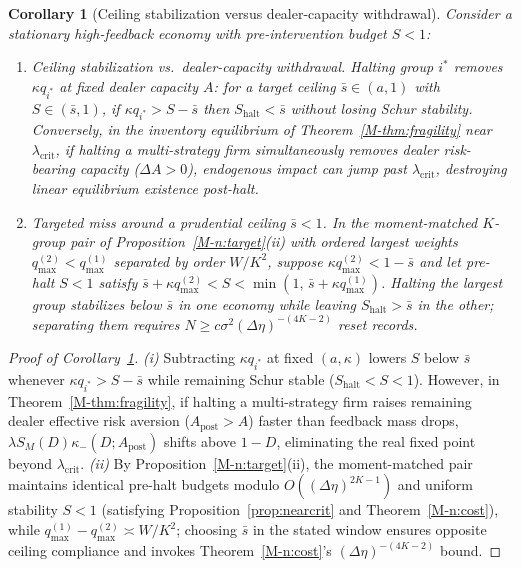 \documentclass[12pt]{article}
\newtheorem{corollary}[theorem]{Corollary}
\theoremstyle{definition}
\theoremstyle{remark}
\begin{document}
\begin{corollary}[Ceiling stabilization versus dealer-capacity withdrawal]\label{cor:posthaltflip}
Consider a stationary high-feedback economy with pre-intervention budget $S < 1$:
\begin{enumerate}
  \item[(i)] \emph{Ceiling stabilization vs.\ dealer-capacity withdrawal.} Halting group $i^*$ removes $\kappa q_{i^*}$ at fixed dealer capacity $A$: for a target ceiling $\bar{s} \in (a, 1)$ with $S \in (\bar{s}, 1)$, if $\kappa q_{i^*} > S - \bar{s}$ then $S_{\mathrm{halt}} < \bar{s}$ without losing Schur stability. Conversely, in the inventory equilibrium of Theorem~\ref{M-thm:fragility} near $\lambda_{\mathrm{crit}}$, if halting a multi-strategy firm simultaneously removes dealer risk-bearing capacity ($\Delta A > 0$), endogenous impact can jump past $\lambda_{\mathrm{crit}}$, destroying linear equilibrium existence post-halt.
  \item[(ii)] \emph{Targeted miss around a prudential ceiling $\bar{s} < 1$.} In the moment-matched $K$-group pair of Proposition~\ref{M-n:target}(ii) with ordered largest weights $q_{\max}^{(2)} < q_{\max}^{(1)}$ separated by order $W/K^2$, suppose $\kappa q_{\max}^{(2)} < 1 - \bar{s}$ and let pre-halt $S < 1$ satisfy $\bar{s} + \kappa q_{\max}^{(2)} < S < \min(1,\, \bar{s} + \kappa q_{\max}^{(1)})$. Halting the largest group stabilizes below $\bar{s}$ in one economy while leaving $S_{\mathrm{halt}} > \bar{s}$ in the other; separating them requires $N \ge c \sigma^2 (\Delta\eta)^{-(4K-2)}$ reset records.
\end{enumerate}
\end{corollary}

\begin{proof}[Proof of Corollary~\ref{cor:posthaltflip}]
\emph{(i)} Subtracting $\kappa q_{i^*}$ at fixed $(a,\kappa)$ lowers $S$ below $\bar{s}$ whenever $\kappa q_{i^*} > S - \bar{s}$ while remaining Schur stable ($S_{\mathrm{halt}} < S < 1$). However, in Theorem~\ref{M-thm:fragility}, if halting a multi-strategy firm raises remaining dealer effective risk aversion ($A_{\mathrm{post}} > A$) faster than feedback mass drops, $\lambda S_M(D)\kappa_-(D; A_{\mathrm{post}})$ shifts above $1 - D$, eliminating the real fixed point beyond $\lambda_{\mathrm{crit}}$. \emph{(ii)} By Proposition~\ref{M-n:target}(ii), the moment-matched pair maintains identical pre-halt budgets modulo $O((\Delta\eta)^{2K-1})$ and uniform stability $S < 1$ (satisfying Proposition~\ref{prop:nearcrit} and Theorem~\ref{M-n:cost}), while $q_{\max}^{(1)} - q_{\max}^{(2)} \asymp W/K^2$; choosing $\bar{s}$ in the stated window ensures opposite ceiling compliance and invokes Theorem~\ref{M-n:cost}'s $(\Delta\eta)^{-(4K-2)}$ bound.
\end{proof}
\end{document}
